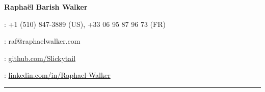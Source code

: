 \documentclass[12pt,letterpaper]{article}
\begin{document}

{\LARGE{\textbf{Raphaël Barish Walker}}}\vspace{7pt}

\faPhone : +1 (510) 847-3889 (US), +33 06 95 87 96 73 (FR)\vspace{4pt}

\faEnvelope : raf@raphaelwalker.com\vspace{4pt}

\faGithub : \href{https://github.com/Slickytail}{github.com/Slickytail}\vspace{4pt}

\faLinkedinSquare : \href{https://linkedin.com/in/raphael-walker}{linkedin.com/in/Raphael-Walker}\vspace{4pt}


\hrule
\end{document}
